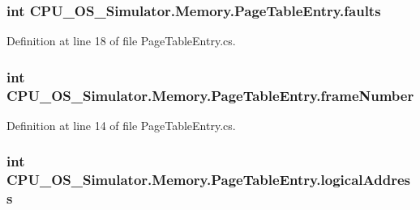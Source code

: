\subsubsection[{faults}]{\setlength{\rightskip}{0pt plus 5cm}int C\+P\+U\+\_\+\+O\+S\+\_\+\+Simulator.\+Memory.\+Page\+Table\+Entry.\+faults\hspace{0.3cm}{\ttfamily [private]}}\label{class_c_p_u___o_s___simulator_1_1_memory_1_1_page_table_entry_a7aefba3f2cb43ba3d9cb37e659d90d44}


Definition at line 18 of file Page\+Table\+Entry.\+cs.

\hypertarget{class_c_p_u___o_s___simulator_1_1_memory_1_1_page_table_entry_ab3e63e9a522928053429134a5da1be6f}{}
\subsubsection[{frame\+Number}]{\setlength{\rightskip}{0pt plus 5cm}int C\+P\+U\+\_\+\+O\+S\+\_\+\+Simulator.\+Memory.\+Page\+Table\+Entry.\+frame\+Number\hspace{0.3cm}{\ttfamily [private]}}\label{class_c_p_u___o_s___simulator_1_1_memory_1_1_page_table_entry_ab3e63e9a522928053429134a5da1be6f}


Definition at line 14 of file Page\+Table\+Entry.\+cs.

\hypertarget{class_c_p_u___o_s___simulator_1_1_memory_1_1_page_table_entry_a8450b36db4a744e50336172e5d4b46b2}{}
\subsubsection[{logical\+Address}]{\setlength{\rightskip}{0pt plus 5cm}int C\+P\+U\+\_\+\+O\+S\+\_\+\+Simulator.\+Memory.\+Page\+Table\+Entry.\+logical\+Address\hspace{0.3cm}{\ttfamily [private]}}\label{class_c_p_u___o_s___simulator_1_1_memory_1_1_page_table_entry_a8450b36db4a744e50336172e5d4b46b2}


